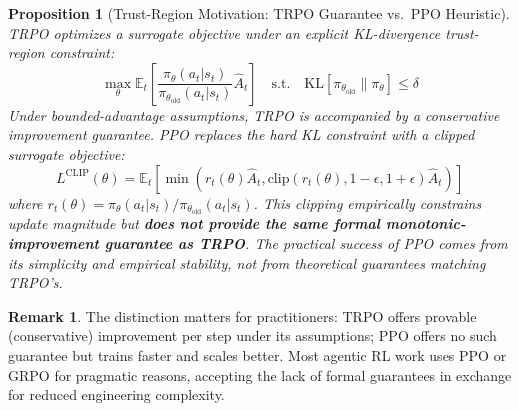 \documentclass[12pt,a4paper]{report}
\newtheorem{proposition}[theorem]{Proposition}
\theoremstyle{definition}
\newtheorem{remark}[theorem]{Remark}
\begin{document}
\begin{proposition}[Trust-Region Motivation: TRPO Guarantee vs.\ PPO Heuristic]
\label{prop:convergence}
TRPO \cite{schulman2015trust} optimizes a surrogate objective under an explicit KL-divergence trust-region constraint:
\begin{equation}
\max_\theta \mathbb{E}_t\left[\frac{\pi_\theta(a_t|s_t)}{\pi_{\theta_{\text{old}}}(a_t|s_t)} \hat{A}_t\right] \quad \text{s.t.} \quad \text{KL}[\pi_{\theta_{\text{old}}} \| \pi_\theta] \leq \delta
\end{equation}
Under bounded-advantage assumptions, TRPO is accompanied by a conservative improvement guarantee. PPO \cite{schulman2017proximal} replaces the hard KL constraint with a clipped surrogate objective:
\begin{equation}
L^{\text{CLIP}}(\theta) = \mathbb{E}_t\left[\min\left(r_t(\theta)\hat{A}_t, \text{clip}(r_t(\theta), 1-\epsilon, 1+\epsilon)\hat{A}_t\right)\right]
\end{equation}
where $r_t(\theta) = \pi_\theta(a_t|s_t)/\pi_{\theta_{\text{old}}}(a_t|s_t)$. This clipping empirically constrains update magnitude but \textbf{does not provide the same formal monotonic-improvement guarantee as TRPO}. The practical success of PPO comes from its simplicity and empirical stability, not from theoretical guarantees matching TRPO's.
\end{proposition}

\begin{remark}
The distinction matters for practitioners: TRPO offers provable (conservative) improvement per step under its assumptions; PPO offers no such guarantee but trains faster and scales better. Most agentic RL work uses PPO or GRPO for pragmatic reasons, accepting the lack of formal guarantees in exchange for reduced engineering complexity.
\end{remark}
\end{document}
